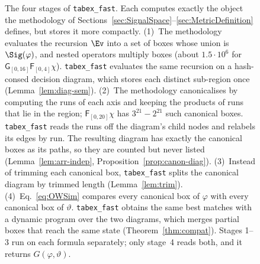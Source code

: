 \begin{figure}[t]
\caption{The four stages of \texttt{tabex\_fast}. Each computes exactly the
object the methodology of
Sections~\ref{sec:SignalSpace}--\ref{sec:MetricDefinition} defines, but stores
it more compactly.
(1)~The methodology evaluates the recursion $\Ev$ into a set of boxes whose
union is $\Sig(\varphi)$, and nested operators multiply boxes (about
$1.5\cdot10^{6}$ for $\mathsf{G}_{[0,16]}\mathsf{F}_{[0,4]}\chi$).
\texttt{tabex\_fast} evaluates the same recursion on a hash-consed decision
diagram, which stores each distinct sub-region once
(Lemma~\ref{lem:diag-sem}).
(2)~The methodology canonicalises by computing the runs of each axis and
keeping the products of runs that lie in the region; $\mathsf{F}_{[0,20]}\chi$
has $3^{21}-2^{21}$ such canonical boxes. \texttt{tabex\_fast} reads the runs
off the diagram's child nodes and relabels its edges by run. The resulting
diagram has exactly the canonical boxes as its paths, so they are counted
but never listed (Lemma~\ref{lem:arr-indep},
Proposition~\ref{prop:canon-diag}).
(3)~Instead of trimming each canonical box, \texttt{tabex\_fast} splits the
canonical diagram by trimmed length (Lemma~\ref{lem:trim}).
(4)~Eq.~\eqref{eq:OWSim} compares every canonical box of $\varphi$ with every
canonical box of $\vartheta$. \texttt{tabex\_fast} obtains the same best
matches with a dynamic program over the two diagrams, which merges partial
boxes that reach the same state (Theorem~\ref{thm:compat}).
Stages 1--3 run on each formula separately; only stage~4 reads both, and it
returns $G(\varphi,\vartheta)$.}
\label{fig:pipelines}
\end{figure}
